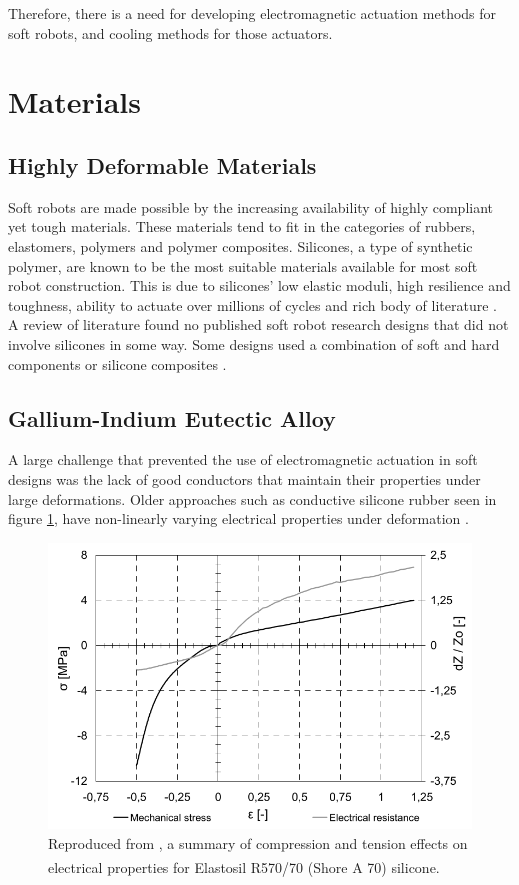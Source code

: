 \documentclass[a4paper,12pt]{article}
\begin{document}
Therefore, there is a need for developing electromagnetic actuation methods for soft robots, and cooling methods for those actuators.

\section{Materials}

\subsection{Highly Deformable Materials}
Soft robots are made possible by the increasing availability of highly compliant yet tough materials. These materials tend to fit in the categories of rubbers, elastomers, polymers and polymer composites. Silicones, a type of synthetic polymer, are known to be the most suitable materials available for most soft robot construction. This is due to silicones’ low elastic moduli, high resilience and toughness, ability to actuate over millions of cycles and rich body of literature \cite{polygerinosSoftRoboticsReview2017}. A review of literature found no published soft robot research designs that did not involve silicones in some way. Some designs used a combination of soft and hard components \cite{stokesHybridCombiningHard2013} or silicone composites \cite{laschiSoftRobotArm2012}.

\subsection{Gallium-Indium Eutectic Alloy}
A large challenge that prevented the use of electromagnetic actuation in soft designs was the lack of good conductors that maintain their properties under large deformations. Older approaches such as conductive silicone rubber seen in figure \ref{fg:conductiveRubber}, have non-linearly varying electrical properties under deformation \cite{valentaMechanicalElectricalTesting2008}.

\begin{figure}[h!]
    \centering
    \includegraphics[width=\textwidth]{valentaConductiveRubber.png}
    \caption{Reproduced from \cite{valentaMechanicalElectricalTesting2008}, a summary of compression and tension effects on electrical properties for Elastosil\textsuperscript{\tiny\textregistered} R570/70 (Shore A 70) silicone.}
    \label{fg:conductiveRubber}
\end{figure}
\end{document}
